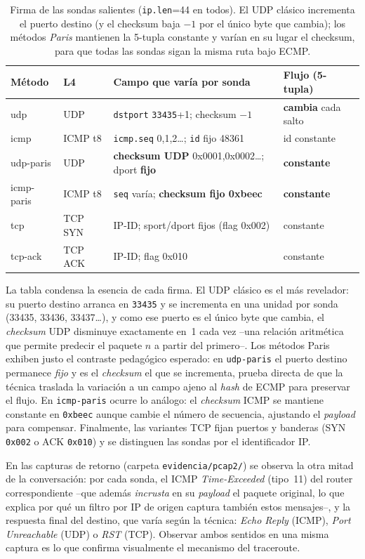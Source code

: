 \documentclass[11pt,a4paper]{article}
\newcommand{\ip}[1]{\texttt{#1}}
\begin{document}
\begin{table}[H]
\centering\footnotesize
\begin{tabularx}{\textwidth}{l l l X}
\toprule
Método & L4 & Campo que varía por sonda & Flujo (5-tupla) \\
\midrule
udp & UDP & \texttt{dstport} \ip{33435}+1; checksum $-1$ & \textbf{cambia} cada salto \\
icmp & ICMP t8 & \texttt{icmp.seq} 0,1,2\dots; \texttt{id} fijo 48361 & id constante \\
udp-paris & UDP & \textbf{checksum UDP} 0x0001,0x0002\dots; dport \textbf{fijo} & \textbf{constante} \\
icmp-paris & ICMP t8 & \texttt{seq} varía; \textbf{checksum fijo 0xbeec} & \textbf{constante} \\
tcp & TCP SYN & IP-ID; sport/dport fijos (flag 0x002) & constante \\
tcp-ack & TCP ACK & IP-ID; flag 0x010 & constante \\
\bottomrule
\end{tabularx}
\caption{Firma de las sondas salientes (\ip{ip.len}=44 en todos). El UDP clásico incrementa el
puerto destino (y el checksum baja $-1$ por el único byte que cambia); los métodos \emph{Paris}
mantienen la 5-tupla constante y varían en su lugar el checksum, para que todas las sondas sigan
la misma ruta bajo ECMP.}
\end{table}

La tabla condensa la esencia de cada firma. El UDP clásico es el más revelador: su puerto destino
arranca en \ip{33435} y se incrementa en una unidad por sonda (33435, 33436, 33437\dots), y como
ese puerto es el único byte que cambia, el \emph{checksum} UDP disminuye exactamente en~1 cada vez
--una relación aritmética que permite predecir el paquete $n$ a partir del primero--. Los métodos
Paris exhiben justo el contraste pedagógico esperado: en \texttt{udp-paris} el puerto destino
permanece \emph{fijo} y es el \emph{checksum} el que se incrementa, prueba directa de que la
técnica traslada la variación a un campo ajeno al \emph{hash} de ECMP para preservar el flujo. En
\texttt{icmp-paris} ocurre lo análogo: el \emph{checksum} ICMP se mantiene constante en
\ip{0xbeec} aunque cambie el número de secuencia, ajustando el \emph{payload} para compensar.
Finalmente, las variantes TCP fijan puertos y banderas (SYN \ip{0x002} o ACK \ip{0x010}) y se
distinguen las sondas por el identificador IP.

En las capturas de retorno (carpeta \texttt{evidencia/pcap2/}) se observa la otra mitad de la
conversación: por cada sonda, el ICMP \emph{Time-Exceeded} (tipo~11) del router correspondiente
--que además \emph{incrusta} en su \emph{payload} el paquete original, lo que explica por qué un
filtro por IP de origen captura también estos mensajes--, y la respuesta final del destino, que
varía según la técnica: \emph{Echo Reply} (ICMP), \emph{Port Unreachable} (UDP) o \emph{RST}
(TCP). Observar ambos sentidos en una misma captura es lo que confirma visualmente el mecanismo
del traceroute.
\end{document}
